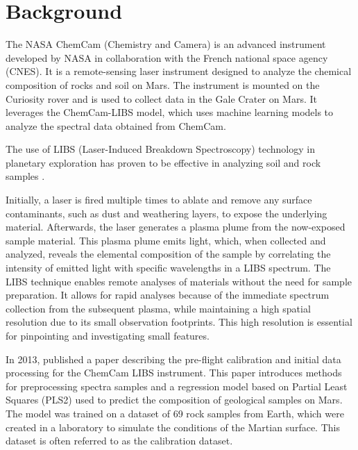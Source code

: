 \section{Background}


The NASA ChemCam (Chemistry and Camera) is an advanced instrument developed by NASA in collaboration with the French national space agency (CNES).
It is a remote-sensing laser instrument designed to analyze the chemical composition of rocks and soil on Mars\cite{chemcam_nasa_website}.
The instrument is mounted on the Curiosity rover and is used to collect data in the Gale Crater on Mars\cite{curiosity_nasa_website}.
It leverages the ChemCam-LIBS model, which uses machine learning models to analyze the spectral data obtained from ChemCam.\cite{andersonImprovedAccuracyQuantitative2017}\cite{cleggRecalibrationMarsScience2017}

The use of LIBS (Laser-Induced Breakdown Spectroscopy) technology in planetary exploration has proven to be effective in analyzing soil and rock samples \cite{knight_characterization_2000}.

Initially, a laser is fired multiple times to ablate and remove any surface contaminants, such as dust and weathering layers, to expose the underlying material.
Afterwards, the laser generates a plasma plume from the now-exposed sample material.
This plasma plume emits light, which, when collected and analyzed, reveals the elemental composition of the sample by correlating the intensity of emitted light with specific wavelengths in a LIBS spectrum.
The LIBS technique enables remote analyses of materials without the need for sample preparation.
It allows for rapid analyses because of the immediate spectrum collection from the subsequent plasma, while maintaining a high spatial resolution due to its small observation footprints.
This high resolution is essential for pinpointing and investigating small features. \cite{wiens_chemcam_2012}

In 2013, \citeauthor{wiens_pre-flight_2013} published a paper describing the pre-flight calibration and initial data processing for the ChemCam LIBS instrument.
This paper introduces methods for preprocessing spectra samples and a regression model based on Partial Least Squares (PLS2) used to predict the composition of geological samples on Mars.
The model was trained on a dataset of 69 rock samples from Earth, which were created in a laboratory to simulate the conditions of the Martian surface.
This dataset is often referred to as the calibration dataset.


